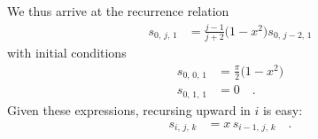 \documentclass[modern]{aastex62}
\begin{document}
%
We thus arrive at the recurrence relation
%
\begin{align}
    s_{0,\,j,\,1} &= \frac{j - 1}{j + 2} \big(1 - x^2\big) s_{0,\,j-2,\,1}
\end{align}
%
with initial conditions
%
\begin{align}
    s_{0,\,0,\,1} &= \frac{\pi}{2} \big(1-x^2\big) \nonumber \\
    s_{0,\,1,\,1} &= 0 \quad.
\end{align}
%
Given these expressions, recursing upward in $i$ is easy:
%
\begin{align}
    s_{i,\,j,\,k} &= x \, s_{i-1,\,j,\,k} \quad.
\end{align}


\end{document}

